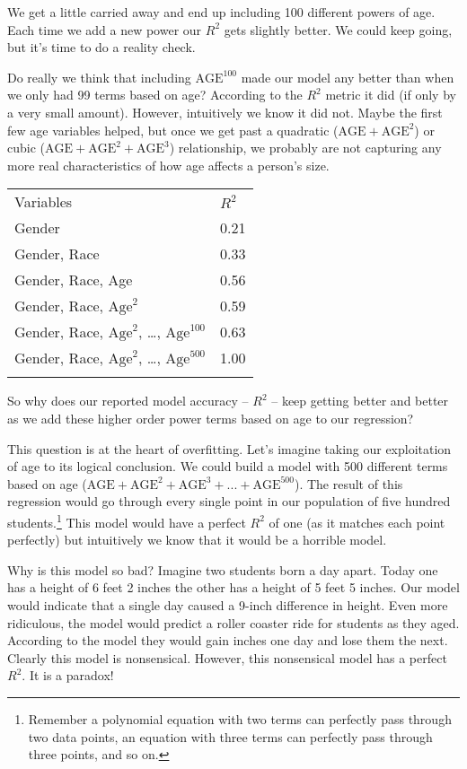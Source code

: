 \documentclass[]{memoir}
\begin{document}
We get a little carried away and end up including 100 different powers
of age. Each time we add a new power our $R^2$ gets slightly better. We
could keep going, but it's time to do a reality check.

Do really we think that including $\text{AGE}^{100}$ made our model any
better than when we only had 99 terms based on age? According to the
$R^2$ metric it did (if only by a very small amount). However,
intuitively we know it did not. Maybe the first few age variables
helped, but once we get past a quadratic ($\text{AGE}+\text{AGE}^2$) or
cubic ($\text{AGE}+\text{AGE}^2+\text{AGE}^3$) relationship, we probably
are not capturing any more real characteristics of how age affects a
person's size.

\begin{longtable}[c]{@{}ll@{}}
\hline\noalign{\medskip}
Variables & $R^2$
\\\noalign{\medskip}
\hline\noalign{\medskip}
Gender & 0.21
\\\noalign{\medskip}
Gender, Race & 0.33
\\\noalign{\medskip}
Gender, Race, Age & 0.56
\\\noalign{\medskip}
Gender, Race, $\text{Age}^2$ & 0.59
\\\noalign{\medskip}
Gender, Race, $\text{Age}^2$, \ldots{}, $\text{Age}^{100}$ & 0.63
\\\noalign{\medskip}
Gender, Race, $\text{Age}^2$, \ldots{}, $\text{Age}^{500}$ & 1.00
\\\noalign{\medskip}
\hline
\end{longtable}

So why does our reported model accuracy -- $R^2$ -- keep getting better
and better as we add these higher order power terms based on age to our
regression?

This question is at the heart of overfitting. Let's imagine taking our
exploitation of age to its logical conclusion. We could build a model
with 500 different terms based on age
($\text{AGE}+\text{AGE}^2+\text{AGE}^3+...+\text{AGE}^{500}$). The
result of this regression would go through every single point in our
population of five hundred students.\footnote{Remember a polynomial
  equation with two terms can perfectly pass through two data points, an
  equation with three terms can perfectly pass through three points, and
  so on.} This model would have a perfect $R^2$ of one (as it matches
each point perfectly) but intuitively we know that it would be a
horrible model.

Why is this model so bad? Imagine two students born a day apart. Today
one has a height of 6 feet 2 inches the other has a height of 5 feet 5
inches. Our model would indicate that a single day caused a 9-inch
difference in height. Even more ridiculous, the model would predict a
roller coaster ride for students as they aged. According to the model
they would gain inches one day and lose them the next. Clearly this
model is nonsensical. However, this nonsensical model has a perfect
$R^2$. It is a paradox!
\end{document}
